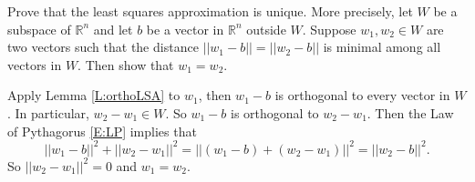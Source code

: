 \documentclass{ximera}
\begin{document}
\begin{exercise} \label{YZ_9.1.5}
Prove that the least squares approximation is unique. More precisely, let $W$ be a subspace of $\mathbb R^n$ 
and let $b$ be a vector in $\mathbb R^n$ outside $W$. Suppose $w_1,w_2\in W$ are two vectors such that the distance $||w_1-b||=||w_2-b||$ is minimal among all vectors in $W$. Then show that $w_1=w_2$.
\begin{solution}

\soln Apply Lemma \ref{L:orthoLSA} to $w_1$, then $w_1-b$ is orthogonal to every vector in $W$. In particular, $w_2-w_1\in W$. So $w_1-b$ is orthogonal to $w_2-w_1$. Then the Law of Pythagorus 
\eqref{E:LP} implies that
\[
||w_1-b||^2+||w_2-w_1||^2=||(w_1-b)+(w_2-w_1)||^2=||w_2-b||^2.
\]
So $||w_2-w_1||^2=0$ and $w_1=w_2$.
\end{solution}
\end{exercise}
\end{document}
